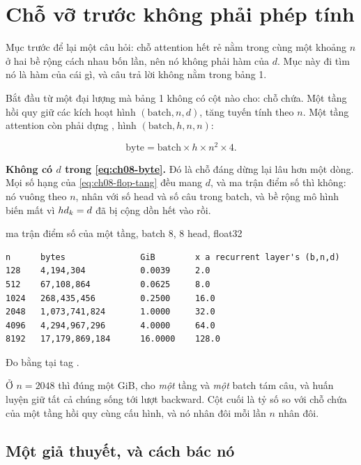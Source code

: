 \section{Chỗ vỡ trước không phải phép tính}
\label{sec:ch08-cho-vo}

%
Mục trước để lại một câu hỏi: chỗ attention hết rẻ nằm trong cùng một khoảng
\(n\) ở hai bề rộng cách nhau bốn lần, nên nó không phải hàm của \(d\). Mục này
đi tìm nó là hàm của cái gì, và câu trả lời không nằm trong bảng 1.

Bắt đầu từ một đại lượng mà bảng 1 không có cột nào cho: chỗ chứa. Một tầng hồi
quy giữ các kích hoạt hình \((\text{batch}, n, d)\), tăng tuyến tính theo \(n\).
Một tầng attention còn phải dựng , hình
\((\text{batch}, h, n, n)\):

\begin{equation}
  \text{byte} = \text{batch} \times h \times n^2 \times 4 .
  \label{eq:ch08-byte}
\end{equation}

%
\textbf{Không có \(d\) trong \eqref{eq:ch08-byte}.} Đó là chỗ đáng dừng lại lâu
hơn một dòng. Mọi số hạng của \eqref{eq:ch08-flop-tang} đều mang \(d\), và ma
trận điểm số thì không: nó vuông theo \(n\), nhân với số head và số câu trong
batch, và bề rộng mô hình biến mất vì \(h d_{k} = d\) đã bị cộng dồn hết vào rồi.

\begin{measured}{ma trận điểm số của một tầng, batch 8, 8 head, float32}
\begin{verbatim}
n      bytes               GiB        x a recurrent layer's (b,n,d)
128    4,194,304           0.0039     2.0
512    67,108,864          0.0625     8.0
1024   268,435,456         0.2500     16.0
2048   1,073,741,824       1.0000     32.0
4096   4,294,967,296       4.0000     64.0
8192   17,179,869,184      16.0000    128.0
\end{verbatim}

Đo bằng  tại tag .
\end{measured}

Ở \(n = 2048\) thì đúng một GiB, cho \emph{một} tầng và \emph{một} batch tám
câu, và huấn luyện giữ tất cả chúng sống tới lượt backward. Cột cuối là tỷ số so
với chỗ chứa của một tầng hồi quy cùng cấu hình, và nó nhân đôi mỗi lần \(n\)
nhân đôi.

\subsection*{Một giả thuyết, và cách bác nó}

